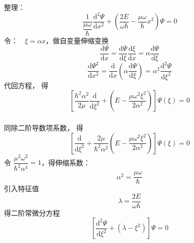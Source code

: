 \begin{frame}
	\frametitle{}
	整理：\\
	\begin{equation*}
		\frac{1}{\dfrac{\mu\omega}{\hbar}} \frac{\mathrm{d} ^2\Psi}{\mathrm{d} x^2} +	\left ( \frac{2E}{\omega \hbar} -\frac{\mu \omega}{\hbar} x^2 \right )\Psi=0
	\end{equation*}
	令：~~$ \xi =\alpha x$，做自变量伸缩变换 \\
	\begin{equation*}
		\frac{\mathrm{d} \Psi}{\mathrm{d} x} =\frac{\mathrm{d} \Psi}{\mathrm{d} \xi} \frac{\mathrm{d} \xi}{\mathrm{d} x}  = \alpha \frac{\mathrm{d} \Psi}{\mathrm{d} \xi}
	\end{equation*}
	\begin{equation*}
		\frac{\mathrm{d} \Psi ^2 }{\mathrm{d} x ^2} =\frac{\mathrm{d}}{\mathrm{d} x}  ( \alpha \frac{\mathrm{d} \Psi}{\mathrm{d} \xi} ) = \alpha ^2 \frac{\mathrm{d} ^2 \Psi}{\mathrm{d} \xi ^2} 
	\end{equation*}
	代回方程， 得\\
	\begin{equation*}
		\left[ \frac{\hbar ^2 \alpha ^2 }{2\mu} \frac{\mathrm{d}}{\mathrm{d} \xi ^2}  + (E- \frac{\mu \omega ^2 \xi ^2}{2 \alpha ^2}  ) \right] \Psi(\xi) =0
	\end{equation*}	
\end{frame}

\begin{frame}
	\frametitle{}
	同除二阶导数项系数， 得\\
	\begin{equation*}
		\left[ \frac{\mathrm{d}}{\mathrm{d} \xi ^2}  + \frac{2\mu}{\hbar ^2 \alpha ^2 } (E- \frac{\mu \omega ^2 \xi ^2}{2 \alpha ^2}  ) \right] \Psi(\xi) =0
	\end{equation*}
	令 $\dfrac{\mu ^2 \omega ^2 }{\hbar ^2 \alpha ^ 4}=1 $，得伸缩系数：\\
	\begin{equation*}
		\alpha ^2= \frac{\mu\omega}{\hbar}
	\end{equation*}
	引入特征值\\
	\begin{equation*}
		\lambda = \frac{2E}{\omega \hbar}
	\end{equation*}
	得二阶常微分方程\\
	\begin{equation*}
		\left[ \frac{\mathrm{d} ^2\Psi}{\mathrm{d} \xi^2} + \left( \lambda - \xi^2 \right) \right] \Psi=0
	\end{equation*}
\end{frame}

